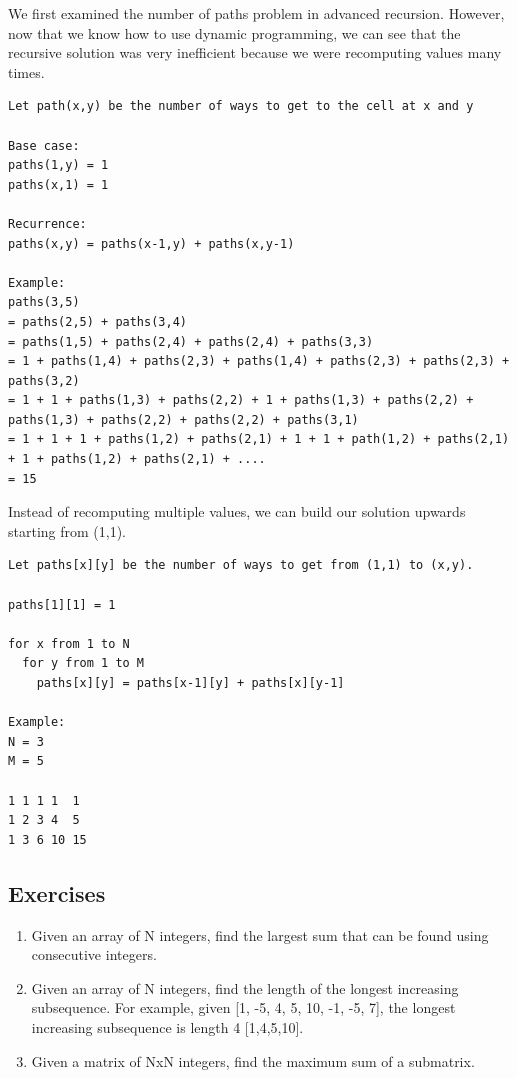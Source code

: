 \documentclass[11pt,oneside]{book}
\begin{document}
We first examined the number of paths problem in advanced recursion. However, now that we know how to use dynamic programming, we can see that the recursive solution was very inefficient because we were recomputing values many times.

\begin{lstlisting}
Let path(x,y) be the number of ways to get to the cell at x and y

Base case:
paths(1,y) = 1
paths(x,1) = 1

Recurrence:
paths(x,y) = paths(x-1,y) + paths(x,y-1)

Example:
paths(3,5)
= paths(2,5) + paths(3,4)
= paths(1,5) + paths(2,4) + paths(2,4) + paths(3,3)
= 1 + paths(1,4) + paths(2,3) + paths(1,4) + paths(2,3) + paths(2,3) + paths(3,2)
= 1 + 1 + paths(1,3) + paths(2,2) + 1 + paths(1,3) + paths(2,2) + paths(1,3) + paths(2,2) + paths(2,2) + paths(3,1)
= 1 + 1 + 1 + paths(1,2) + paths(2,1) + 1 + 1 + path(1,2) + paths(2,1) + 1 + paths(1,2) + paths(2,1) + ....
= 15
\end{lstlisting}

Instead of recomputing multiple values, we can build our solution upwards starting from (1,1).

\begin{lstlisting}
Let paths[x][y] be the number of ways to get from (1,1) to (x,y). 

paths[1][1] = 1

for x from 1 to N
  for y from 1 to M
    paths[x][y] = paths[x-1][y] + paths[x][y-1]

Example:
N = 3
M = 5

1 1 1 1  1
1 2 3 4  5
1 3 6 10 15
\end{lstlisting}

\subsection{Exercises}

\begin{enumerate}
\item Given an array of N integers, find the largest sum that can be found using consecutive integers.
\item Given an array of N integers, find the length of the longest increasing subsequence. For example, given [1, -5, 4, 5, 10, -1, -5, 7], the longest increasing subsequence is length 4 [1,4,5,10].
\item Given a matrix of NxN integers, find the maximum sum of a submatrix.
\end{enumerate}
\end{document}

